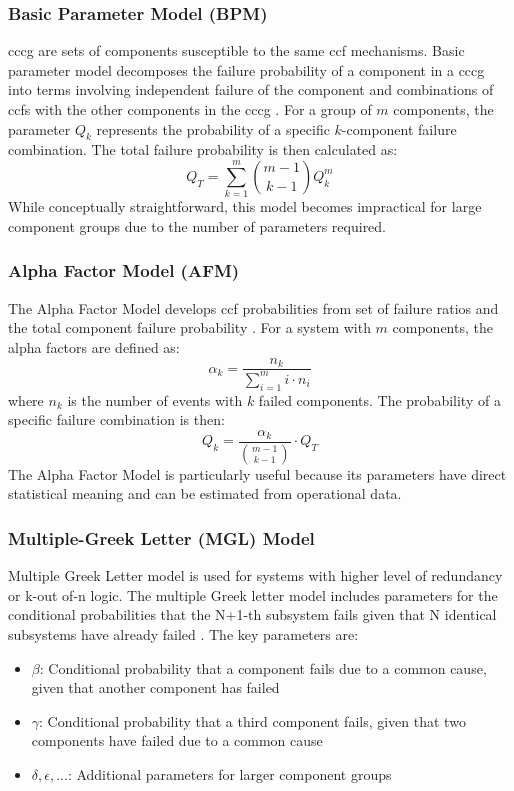 \subsubsection{Basic Parameter Model (BPM)}
\acrfull{cccg} are sets of components susceptible to the same \acrshort{ccf} mechanisms. Basic parameter model decomposes the failure probability of a component in a \acrshort{cccg} into terms involving independent failure of the component and combinations of \acrshort{ccf}s with the other components in the \acrshort{cccg} \cite{rasmuson_kelly_2008}. For a group of $m$ components, the parameter $Q_k$ represents the probability of a specific $k$-component failure combination. The total failure probability is then calculated as:
\[
Q_T = \sum_{k=1}^{m} \binom{m-1}{k-1} Q_k^m
\]
While conceptually straightforward, this model becomes impractical for large component groups due to the number of parameters required.

\subsubsection{Alpha Factor Model (AFM)}
The Alpha Factor Model develops \acrshort{ccf} probabilities from set of failure ratios and the total component failure probability \cite{rasmuson_kelly_2008}. For a system with $m$ components, the alpha factors are defined as:
\[
\alpha_k = \frac{n_k}{\sum_{i=1}^{m} i \cdot n_i}
\]
where $n_k$ is the number of events with $k$ failed components. The probability of a specific failure combination is then:
\[
Q_k = \frac{\alpha_k}{\binom{m-1}{k-1}} \cdot Q_T
\]
The Alpha Factor Model is particularly useful because its parameters have direct statistical meaning and can be estimated from operational data.

\subsubsection{Multiple-Greek Letter (MGL) Model}
Multiple Greek Letter model is used for systems with higher level of redundancy or k-out of-n logic. The multiple Greek letter model includes parameters for the conditional probabilities that the N+1-th subsystem fails given that N identical subsystems have already failed \cite{jones_2012}. The key parameters are:
\begin{itemize}
  \item $\beta$: Conditional probability that a component fails due to a common cause, given that another component has failed
  \item $\gamma$: Conditional probability that a third component fails, given that two components have failed due to a common cause
  \item $\delta, \epsilon, ... $: Additional parameters for larger component groups
\end{itemize}

